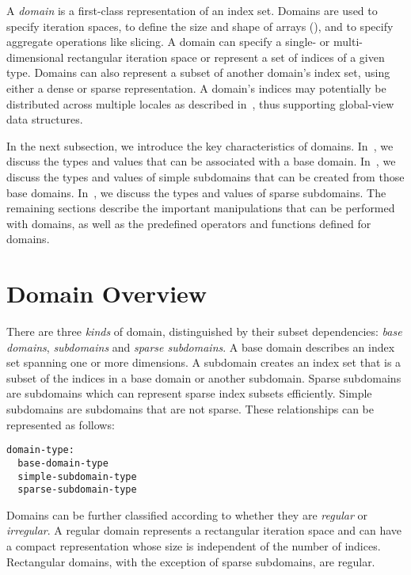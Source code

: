 \label{Domains}

A \emph{domain} is a first-class representation of an index set.
Domains are used to specify iteration spaces, to define the size and
shape of arrays (), and to specify aggregate operations
like slicing.
A domain can specify a single- or multi-dimensional
rectangular iteration space or represent a set of indices of
a given type.  Domains can also represent a subset of another domain's index set,
using either a dense or sparse representation.
A domain's
indices may potentially be distributed across multiple locales as
described in~, thus supporting global-view data
structures.

In the next subsection, we introduce the key characteristics of
domains.  In~, we discuss the types
and values that can be associated with a base domain.
In~, we discuss the types and
values of simple subdomains that can be created from those base
domains.  In~, we discuss the
types and values of sparse subdomains.  The remaining sections
describe the important manipulations that can be performed with
domains, as well as the predefined operators and functions defined for
domains.

\section{Domain Overview}

There are three \emph{kinds} of domain, distinguished by their subset
dependencies: \emph{base domains}, \emph{subdomains} and \emph{sparse
subdomains}.  A base domain describes an index set spanning one or more
dimensions.  A subdomain creates an index set that is a subset of the indices in
a base domain or another subdomain.  Sparse subdomains are subdomains which can
represent sparse index subsets efficiently.  Simple subdomains are subdomains
that are not sparse.  These relationships can be represented as follows:

\begin{syntax}
\begin{verbatim}
domain-type:
  base-domain-type
  simple-subdomain-type
  sparse-subdomain-type
\end{verbatim}
\end{syntax}

Domains can be further classified according to whether they are \emph{regular}
or \emph{irregular}.  A regular domain represents a rectangular iteration
space and can have a compact representation whose size is independent
of the number of indices. Rectangular domains, with the exception of
sparse subdomains, are regular.

